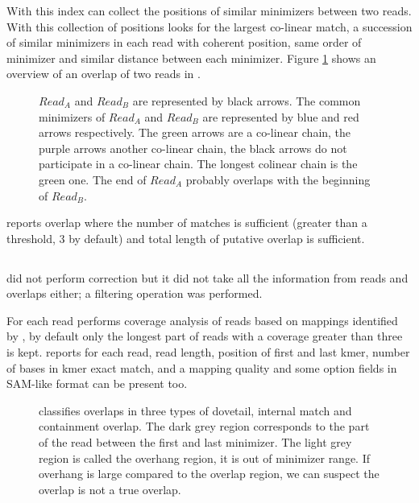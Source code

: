 \documentclass[main]{subfiles}
\begin{document}
With this index \minimap can collect the positions of similar minimizers between two reads. With this collection of positions \minimap looks for the largest co-linear match, a succession of similar minimizers in each read with coherent position, same order of minimizer and similar distance between each minimizer. Figure \ref{sota:fig:miniasm:mapping} shows an overview of an overlap of two reads in \minimap.

\begin{figure}[ht]
    \centering
    
    \caption{$Read_A$ and $Read_B$ are represented by black arrows. The common minimizers of $Read_A$ and $Read_B$ are represented by blue and red arrows respectively. The green arrows are a co-linear chain, the purple arrows another co-linear chain, the black arrows do not participate in a co-linear chain. The longest colinear chain is the green one. The end of $Read_A$ probably overlaps with the beginning of $Read_B$.}
    \label{sota:fig:miniasm:mapping}
\end{figure}

\minimap reports overlap where the number of matches is sufficient (greater than a threshold, 3 by default) and  total length of putative overlap is sufficient. 

\subsection{\miniasm}

\miniasm did not perform correction but it did not take all the information from reads and overlaps either; a filtering operation was performed.

For each read \miniasm performs coverage analysis of reads based on mappings identified by \minimap, by default only the longest part of reads with a coverage greater than three is kept. \minimap reports for each read, read length, position of first and last kmer, number of bases in kmer exact match, and a mapping quality and some option fields in SAM-like format can be present too.

\begin{figure}[ht]
    \centering
    
    \caption{\miniasm classifies overlaps in three types of dovetail, internal match and containment overlap. The dark grey region corresponds to the part of the read between the first and last minimizer. The light grey region is called the overhang region, it is out of minimizer range. If overhang is large compared to the overlap region, we can suspect the overlap is not a true overlap.}
    \label{sota:fig:miniasm:ovl_classification}
\end{figure}
\end{document}
